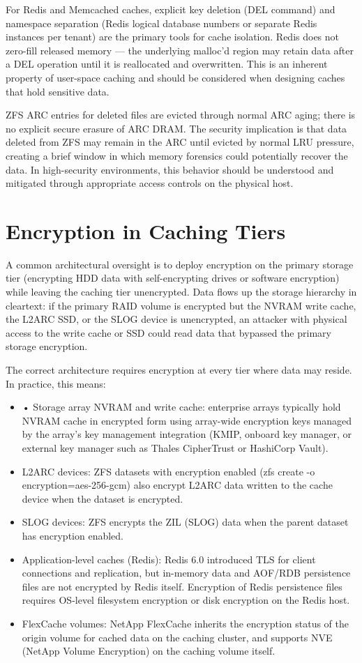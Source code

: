 For Redis and Memcached caches, explicit key deletion (DEL command) and namespace separation (Redis logical database numbers or separate Redis instances per tenant) are the primary tools for cache isolation. Redis does not zero-fill released memory --- the underlying malloc'd region may retain data after a DEL operation until it is reallocated and overwritten. This is an inherent property of user-space caching and should be considered when designing caches that hold sensitive data.

ZFS ARC entries for deleted files are evicted through normal ARC aging; there is no explicit secure erasure of ARC DRAM. The security implication is that data deleted from ZFS may remain in the ARC until evicted by normal LRU pressure, creating a brief window in which memory forensics could potentially recover the data. In high-security environments, this behavior should be understood and mitigated through appropriate access controls on the physical host.

\section{Encryption in Caching Tiers}
A common architectural oversight is to deploy encryption on the primary storage tier (encrypting HDD data with self-encrypting drives or software encryption) while leaving the caching tier unencrypted. Data flows up the storage hierarchy in cleartext: if the primary RAID volume is encrypted but the NVRAM write cache, the L2ARC SSD, or the SLOG device is unencrypted, an attacker with physical access to the write cache or SSD could read data that bypassed the primary storage encryption.

The correct architecture requires encryption at every tier where data may reside. In practice, this means:

\begin{itemize}
  \item • Storage array NVRAM and write cache: enterprise arrays typically hold NVRAM cache in encrypted form using array-wide encryption keys managed by the array's key management integration (KMIP, onboard key manager, or external key manager such as Thales CipherTrust or HashiCorp Vault).
  \item L2ARC devices: ZFS datasets with encryption enabled (zfs create -o encryption=aes-256-gcm) also encrypt L2ARC data written to the cache device when the dataset is encrypted.
  \item SLOG devices: ZFS encrypts the ZIL (SLOG) data when the parent dataset has encryption enabled.
  \item Application-level caches (Redis): Redis 6.0 introduced TLS for client connections and replication, but in-memory data and AOF/RDB persistence files are not encrypted by Redis itself. Encryption of Redis persistence files requires OS-level filesystem encryption or disk encryption on the Redis host.
  \item FlexCache volumes: NetApp FlexCache inherits the encryption status of the origin volume for cached data on the caching cluster, and supports NVE (NetApp Volume Encryption) on the caching volume itself.
\end{itemize}

